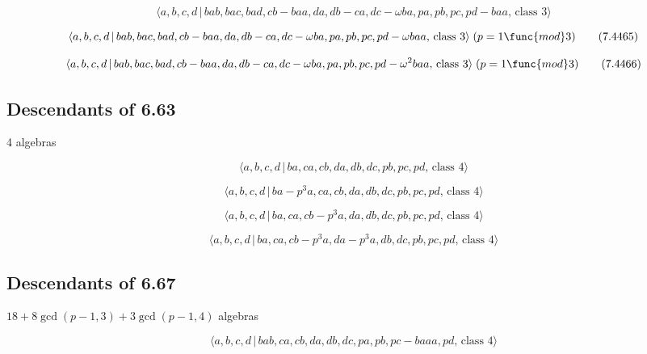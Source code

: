 \documentclass[10pt]{article}
\begin{document}
\begin{equation}
\langle a,b,c,d\,|\,bab,bac,bad,cb-baa,da,db-ca,dc-\omega
ba,pa,pb,pc,pd-baa,\,\text{class }3\rangle  \tag{7.4464}
\end{equation}

\begin{equation}
\langle a,b,c,d\,|\,bab,bac,bad,cb-baa,da,db-ca,dc-\omega
ba,pa,pb,pc,pd-\omega baa,\,\text{class }3\rangle \;(p=1\func{mod}3) 
\tag{7.4465}
\end{equation}

\begin{equation}
\langle a,b,c,d\,|\,bab,bac,bad,cb-baa,da,db-ca,dc-\omega
ba,pa,pb,pc,pd-\omega ^{2}baa,\,\text{class }3\rangle \;(p=1\func{mod}3) 
\tag{7.4466}
\end{equation}

\subsection{Descendants of 6.63}

4 algebras

\begin{equation}
\langle a,b,c,d\,|\,ba,ca,cb,da,db,dc,pb,pc,pd,\,\text{class }4\rangle 
\tag{7.4467}
\end{equation}

\begin{equation}
\langle a,b,c,d\,|\,ba-p^3a,ca,cb,da,db,dc,pb,pc,pd,\,\text{class }4\rangle 
\tag{7.4468}
\end{equation}

\begin{equation}
\langle a,b,c,d\,|\,ba,ca,cb-p^3a,da,db,dc,pb,pc,pd,\,\text{class }4\rangle 
\tag{7.4469}
\end{equation}

\begin{equation}
\langle a,b,c,d\,|\,ba,ca,cb-p^3a,da-p^3a,db,dc,pb,pc,pd,\,\text{class }%
4\rangle  \tag{7.4470}
\end{equation}

\subsection{Descendants of 6.67}

$18+8\gcd (p-1,3)+3\gcd (p-1,4)$ algebras

\begin{equation}
\langle a,b,c,d\,|\,bab,ca,cb,da,db,dc,pa,pb,pc-baaa,pd,\,\text{class }%
4\rangle  \tag{7.4471}
\end{equation}
\end{document}
